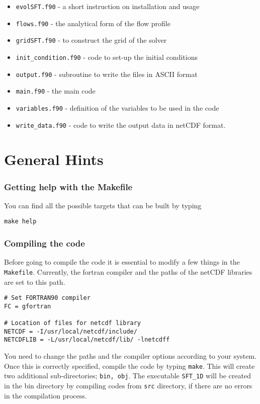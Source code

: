 \begin{itemize}\itemsep=0pt
\item {\tt evolSFT.f90} - a short instruction on installation and usage
\item {\tt flows.f90} - the analytical form of the flow profile
\item {\tt grid\-SFT.f90} - to construct the grid of the solver
\item {\tt init\_condition.f90} - code to set-up the initial conditions
\item {\tt output.f90} - subroutine to write the files in ASCII format
\item {\tt main.f90} - the main code
\item {\tt variables.f90} - definition of the variables to be used in the code
\item {\tt write\_data.f90} - code to write the output data in netCDF format.
\end{itemize}

\section{General Hints}

\subsubsection{Getting help with the Makefile}

You can find all the possible
targets  that can be built by typing
\begin{verbatim}
make help
\end{verbatim}

\subsubsection{Compiling the code}
Before going to compile the code it is essential to modify a few things in the \texttt{Makefile}.
Currently, the fortran compiler and the paths of the netCDF libraries are set to this path.
\begin{verbatim}
# Set FORTRAN90 compiler
FC = gfortran

# Location of files for netcdf library
NETCDF = -I/usr/local/netcdf/include/
NETCDFLIB = -L/usr/local/netcdf/lib/ -lnetcdff
\end{verbatim}
You need to change the paths and the compiler options according to your system. Once this is correctly specified, compile the code by typing \texttt{make}. This will create two additional sub-directories; \texttt{bin, obj}. The executable \texttt{SFT\_1D} will be created in the bin directory by compiling codes from \texttt{src} directory, if there are no errors in the compilation process.

